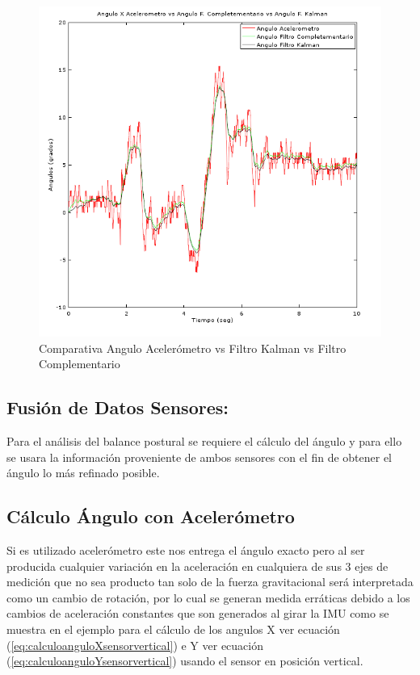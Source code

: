 \documentclass[12pt,a4paper]{article}
\begin{document}
\begin{figure}[H]
\centering
  \includegraphics[scale=0.7]{images/angKalCom}
  \caption{Comparativa Angulo Acelerómetro vs Filtro Kalman vs Filtro Complementario}
  \label{fig:AnguloXvsFiltros}
\end{figure}

\subsection{Fusión de Datos Sensores:}
Para el análisis del balance postural se requiere el cálculo del ángulo y para ello se usara la información proveniente de ambos sensores con el fin de obtener el ángulo lo más refinado posible.

\subsection{Cálculo Ángulo con Acelerómetro} Si es utilizado acelerómetro este nos entrega el ángulo exacto pero al ser producida cualquier variación en la aceleración en cualquiera de sus 3 ejes de medición que no sea producto tan solo de la fuerza gravitacional será interpretada como un cambio de rotación, por lo cual se generan medida erráticas debido a los cambios de aceleración constantes que son generados al girar la IMU como se muestra en el ejemplo para el cálculo de los angulos X ver ecuación (\ref{eq:calculoanguloXsensorvertical}) e Y ver ecuación (\ref{eq:calculoanguloYsensorvertical}) usando el sensor en posición vertical.
\end{document}
